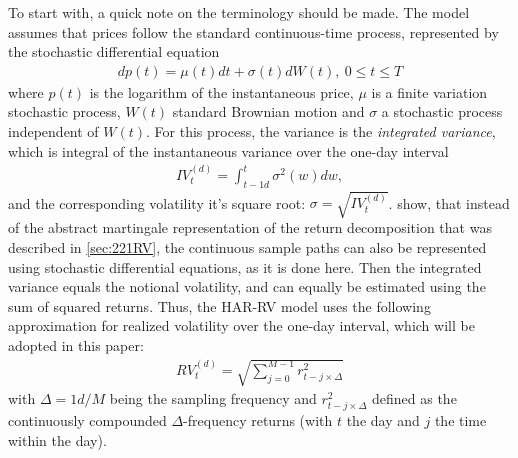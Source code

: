To start with, a quick note on the terminology should be made. The model assumes that prices follow the standard continuous-time process, represented by the stochastic differential equation
\begin{align}\label{eq:return-process-corsi}
dp(t) = \mu(t)dt + \sigma(t)dW(t), \ 0 \leq t \leq T
\end{align}
where $p(t)$ is the logarithm of the instantaneous price, $\mu$ is a finite variation stochastic process, $W(t)$ standard Brownian motion and $\sigma$ a stochastic process independent of $W(t)$. For this process, the variance is the \emph{integrated variance}, which is integral of the instantaneous variance over the one-day interval
\begin{align}
IV_{t}^{(d)} =  \int_{t-1d}^{t} \sigma^{2}(w)dw, 
\end{align}
and the corresponding volatility it's square root: $\sigma = \sqrt{IV_{t}^{(d)}}$.
\textcite{andersen2001} show, that instead of the abstract martingale representation of the return decomposition that was described in \ref{sec:221RV}, the continuous sample paths can also be represented using stochastic differential equations, as it is done here. Then the integrated variance equals the notional volatility, and can equally be estimated using the sum of squared returns. Thus, the HAR-RV model uses the following approximation for realized volatility over the one-day interval, which will be adopted in this paper:
\begin{align}
RV_{t}^{(d)} = \sqrt{\sum_{j=0}^{M-1} r^{2}_{t-j \times \Delta}}
\end{align}
with $\Delta = 1d/M$ being the sampling frequency and $r^{2}_{t-j \times \Delta}$ defined as the continuously compounded $\Delta$-frequency returns (with $t$ the day and $j$ the time within the day). \\
